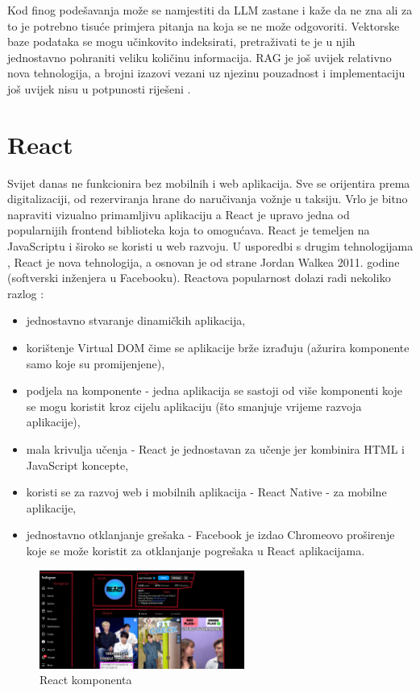 \documentclass[]{foi}
\begin{document}
Kod finog podešavanja može se namjestiti da LLM zastane i kaže da ne zna ali za to je potrebno tisuće primjera pitanja na koja se ne može odgovoriti. Vektorske baze podataka 
se mogu učinkovito indeksirati, pretraživati te je u njih jednostavno pohraniti veliku količinu informacija. RAG je još uvijek relativno nova tehnologija, a brojni izazovi vezani uz njezinu
pouzadnost i implementaciju još uvijek nisu u potpunosti riješeni \cite{ibmRAG}.


\chapter{React}

Svijet danas ne funkcionira bez mobilnih i web aplikacija. Sve se orijentira prema digitalizaciji, od rezerviranja hrane do naručivanja vožnje u taksiju. Vrlo je bitno napraviti vizualno
primamljivu aplikaciju a React je upravo jedna od popularnijih frontend biblioteka koja to omogućava. React je temeljen na JavaScriptu i široko se koristi u web razvoju. U usporedbi s drugim tehnologijama
, React je nova tehnologija, a osnovan je od strane Jordan Walkea 2011. godine (softverski inženjera u Facebooku). Reactova popularnost dolazi radi nekoliko razlog \cite{simplilearn2025react}:
\begin{itemize}
    \item jednostavno stvaranje dinamičkih aplikacija,
    \item korištenje Virtual DOM čime se aplikacije brže izrađuju (ažurira komponente samo koje su promijenjene),
    \item podjela na komponente - jedna aplikacija se sastoji od više komponenti koje se mogu koristit kroz cijelu aplikaciju (što smanjuje vrijeme razvoja aplikacije),
    \item mala krivulja učenja - React je jednostavan za učenje jer kombinira HTML i JavaScript koncepte,
    \item koristi se za razvoj web i mobilnih aplikacija - React Native - za mobilne aplikacije,
    \item jednostavno otklanjanje grešaka - Facebook je izdao Chromeovo proširenje koje se može koristit za otklanjanje pogrešaka u React aplikacijama.
\end{itemize}

\begin{figure}[ht!]
    \centering
    \includegraphics[width=0.6\textwidth]{./assets/components.png} 
    \caption{React komponenta}
    \label{fig:slika5}
\end{figure}
\end{document}

